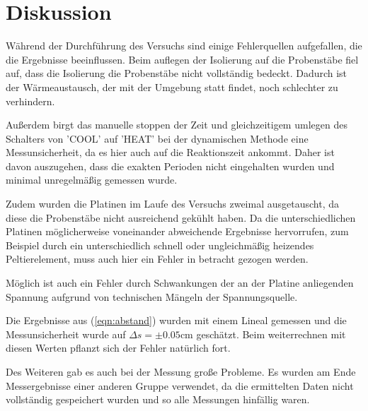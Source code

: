 \newpage
\section{Diskussion}
Während der Durchführung des Versuchs sind einige Fehlerquellen aufgefallen, die die Ergebnisse beeinflussen.
Beim auflegen der Isolierung auf die Probenstäbe fiel auf, dass die Isolierung die Probenstäbe nicht vollständig bedeckt.
Dadurch ist der Wärmeaustausch, der mit der Umgebung statt findet, noch schlechter zu verhindern.

\noindent Außerdem birgt das manuelle stoppen der Zeit und gleichzeitigem umlegen des Schalters von 'COOL' auf 'HEAT' bei der dynamischen Methode eine Messunsicherheit, 
da es hier auch auf die Reaktionszeit ankommt.
Daher ist davon auszugehen, dass die exakten Perioden nicht eingehalten wurden und minimal unregelmäßig gemessen wurde.

\noindent Zudem wurden die Platinen im Laufe des Versuchs zweimal ausgetauscht, da diese die Probenstäbe nicht ausreichend gekühlt haben.
Da die unterschiedlichen Platinen möglicherweise voneinander abweichende Ergebnisse hervorrufen, 
zum Beispiel durch ein unterschiedlich schnell oder ungleichmäßig heizendes Peltierelement, muss auch hier ein Fehler in betracht gezogen werden.

\noindent Möglich ist auch ein Fehler durch Schwankungen der an der Platine anliegenden Spannung aufgrund von technischen Mängeln der Spannungsquelle.

\noindent Die Ergebnisse aus (\ref{eqn:abstand})
wurden mit einem Lineal gemessen und die Messunsicherheit wurde auf $\Delta s=\pm 0.05 \si{\centi\meter}$ geschätzt.
Beim weiterrechnen mit diesen Werten pflanzt sich der Fehler natürlich fort.

\noindent
Des Weiteren gab es auch bei der Messung große Probleme.
Es wurden am Ende Messergebnisse einer anderen Gruppe verwendet, da die ermittelten Daten nicht vollständig gespeichert wurden und so alle Messungen hinfällig waren. 

\label{sec:Diskussion}
